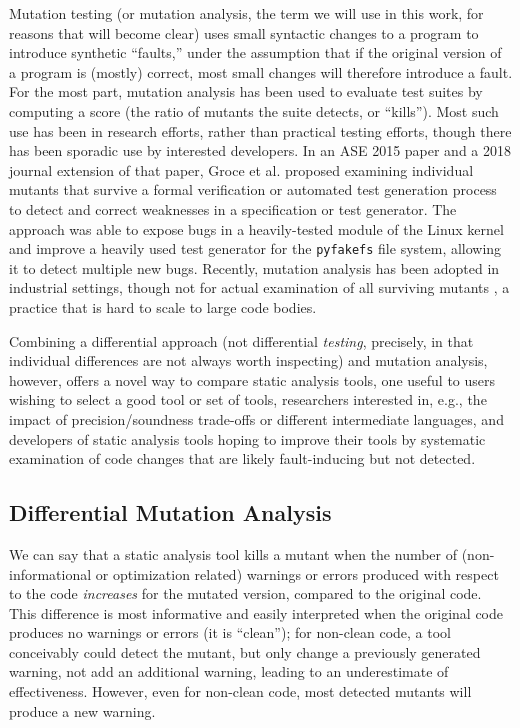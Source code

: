 Mutation testing \cite{jia2011analysis,demillo1978hints,budd1980theoretical} (or mutation analysis, the term we will use in this work, for reasons that will become clear) uses small syntactic changes to a program to introduce synthetic ``faults,'' under the assumption that if the original version of a program is (mostly) correct, most small changes will therefore introduce a fault.  For the most part, mutation analysis has been used to evaluate test suites by computing a score (the ratio of mutants the suite detects, or ``kills'').  Most such use has been in research efforts, rather than practical testing efforts, though there has been sporadic use by interested developers.
In an ASE 2015 \cite{groce2015verified} paper and a 2018 journal extension \cite{groce2018verified} of that paper, Groce et al. proposed examining individual mutants that survive a formal verification or automated test generation process to detect and correct weaknesses in a specification or test generator.  The approach was able to expose bugs in a heavily-tested module of the Linux kernel \cite{mutKernel} and improve a heavily used test generator for the {\tt pyfakefs} file system, allowing it to detect multiple new bugs.  Recently, mutation analysis has been adopted in industrial settings, though not for actual examination of all surviving mutants \cite{MutGoogle,ivankovic2018industrial}, a practice that is hard to scale to large code bodies.

Combining a differential approach (not differential \emph{testing}, precisely, in that individual differences are not always worth inspecting) and mutation analysis, however, offers a novel way to compare static analysis tools, one useful to users wishing to select a good tool or set of tools, researchers interested in, e.g., the impact of precision/soundness trade-offs or different intermediate languages, and developers of static analysis tools hoping to improve their tools by systematic examination of code changes that are likely fault-inducing but not detected.

\subsection{Differential Mutation Analysis}

We can say that a static analysis tool kills a mutant when the number of (non-informational or optimization related) warnings or errors produced with respect to the code \emph{increases} for the mutated version, compared to the original code.  This difference is most informative and easily interpreted when the original code produces no warnings or errors (it is ``clean''); for non-clean code, a tool conceivably could detect the mutant, but only change a previously generated warning, not add an additional warning, leading to an underestimate of effectiveness.  However, even for non-clean code, most detected mutants will produce a new warning.

